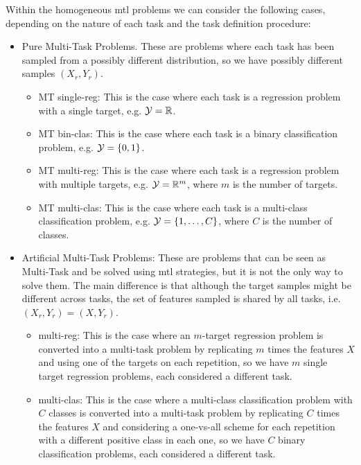 Within the homogeneous \acrshort{mtl} problems we can consider the following cases, depending on the nature of each task and the task definition procedure:
\begin{itemize}
    \item Pure Multi-Task Problems. These are problems where each task has been sampled from a possibly different distribution, so we have possibly different samples $(X_r, Y_r)$.
    \begin{itemize}
        \item MT single-reg: This is the case where each task is a regression problem with a single target, e.g. $\mathcal{Y} = \mathbb{R}$. 
        \item MT bin-clas: This is the case where each task is a binary classification problem, e.g. $\mathcal{Y} = \left\{0, 1\right\}$. 
        \item MT multi-reg: This is the case where each task is a regression problem with multiple targets, e.g. $\mathcal{Y} = \mathbb{R}^m$, where $m$ is the number of targets. 
        \item MT multi-clas: This is the case where each task is a multi-class classification problem, e.g. $\mathcal{Y} = \left\{1, \ldots, C\right\}$, where $C$ is the number of classes.
    \end{itemize}
    \item Artificial Multi-Task Problems: These are problems that can be seen as Multi-Task and be solved using \acrshort{mtl} strategies, but it is not the only way to solve them. The main difference is that although the target samples might be different across tasks, the set of features sampled is shared by all tasks, i.e. $(X_r, Y_r) = (X, Y_r)$.
    \begin{itemize}
        \item multi-reg: This is the case where an $m$-target regression problem is converted into a multi-task problem by replicating $m$ times the features $X$ and using one of the targets on each repetition, so we have $m$ single target regression problems, each considered a different task.
        \item multi-clas: This is the case where a multi-class classification problem with $C$ classes is converted into a multi-task problem by replicating $C$ times the features $X$ and considering a one-vs-all scheme for each repetition with a different positive class in each one, so we have $C$ binary classification problems, each considered a different task.
    \end{itemize}
\end{itemize}

